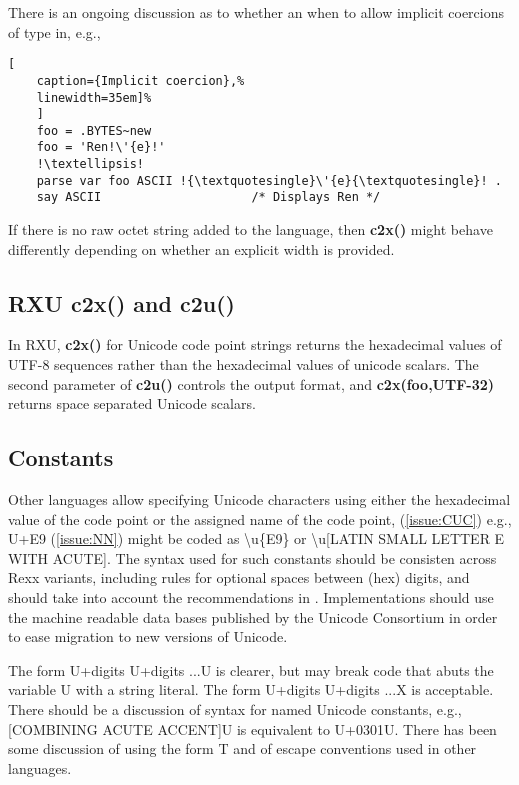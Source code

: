 \documentclass[b4paper]{article}
\begin{document}
There is an ongoing discussion as to whether an when to allow implicit coercions of type in, e.g.,
\begin{lstlisting}[
    caption={Implicit coercion},%
    linewidth=35em]%
    ]
    foo = .BYTES~new
    foo = 'Ren!\'{e}!'
    !\textellipsis!
    parse var foo ASCII !{\textquotesingle}\'{e}{\textquotesingle}! .
    say ASCII                     /* Displays Ren */
\end{lstlisting}

If there is no raw octet string added to the language,
then \textbf{c2x()} might behave differently depending on whether an explicit width is provided.

\subsection{RXU c2x() and c2u()}
In RXU, \textbf{c2x()} for Unicode code point strings returns the
hexadecimal values of UTF-8 sequences rather than the hexadecimal
values of unicode scalars. The second parameter of \textbf{c2u()}
controls the output format, and \textbf{c2x(foo,UTF-32)} returns space
separated Unicode scalars.

\subsection{Constants}
Other languages allow specifying Unicode characters using either
the hexadecimal value of the code point or the assigned name of the code point,
(\cref{issue:CUC})
e.g., U+E9
(\cref{issue:NN})
might be coded as {\textbackslash}u\{E9\} or {\textbackslash}u[LATIN SMALL LETTER E WITH ACUTE].
The syntax used for such constants should be consisten across Rexx variants,
including rules for optional spaces between (hex) digits,
and should take into account the recommendations in \cite{RFC:5137}.
Implementations should use the machine readable data bases published by
the Unicode Consortium in order to ease migration to new versions of Unicode.

The form {\textquotesingle}U+digits U+digits ...{\textquotesingle}U is clearer,
but may break code that abuts the variable U with a string literal.
The form {\textquotesingle}U+digits U+digits ...{\textquotesingle}X is acceptable.
There should be a discussion of syntax for named Unicode constants, e.g.,
{\textquotesingle}[COMBINING ACUTE ACCENT]{\textquotesingle}U is
equivalent to {\textquotesingle}U+0301{\textquotesingle}U.
There has been some discussion of using the form
{\textquotesingle}\textellipsis{\textquotesingle}T and of escape conventions
used in other languages.
\end{document}

